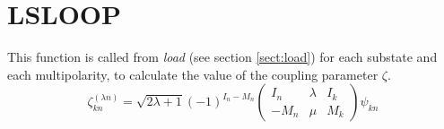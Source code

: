 \section{LSLOOP}
\label{sect:lsloop}

\noindent This function is called from {\em load} (see section
\ref{sect:load}) for each substate and each multipolarity, to calculate the
value of the coupling parameter $\zeta$.\\

\begin{equation}
\zeta_{kn}^{(\lambda n)} =
\sqrt{2 \lambda + 1}
(-1)^{I_n - M_n}
\begin{pmatrix}
I_n & \lambda & I_k\\
-M_n & \mu & M_k
\end{pmatrix}
\psi_{kn}
\end{equation}
